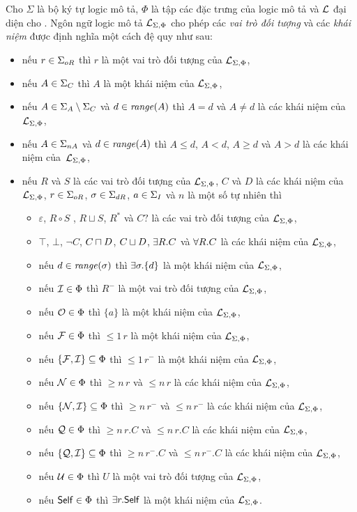 \begin{Definition}
\label{def:LSPLanguage}
Cho $\Sigma$ là bộ ký tự logic mô tả, $\Phi$ là tập các đặc trưng của logic mô tả và $\mathcal{L}$ đại diện cho \ALCreg. Ngôn ngữ logic mô tả $\mathcal{L}_{\Sigma,\Phi}$ cho phép các {\em vai trò đối tượng} và các {\em khái niệm} được định nghĩa một cách đệ quy như sau:
\begin{itemize}
	\item nếu $r \in \Sigma_{oR}$ thì $r$ là một vai trò đối tượng của $\mathcal{L}_{\Sigma,\Phi}$,
	\item nếu $A \in \Sigma_C$ thì $A$ là một khái niệm của $\mathcal{L}_{\Sigma,\Phi}$,
	\item nếu $A \in \Sigma_A\setminus\Sigma_C$ và $d \in \mathit{range}(A)$ thì $A=d$ và $A \neq d$ là các khái niệm của $\mathcal{L}_{\Sigma,\Phi}$,
	\item nếu $A \in \Sigma_{nA}$ và $d \in \mathit{range}(A)$ thì $A \leq d$, $A < d$, $A \geq d$ và $A > d$ là các khái niệm của~$\mathcal{L}_{\Sigma,\Phi}$,
	\item nếu $R$ và $S$ là các vai trò đối tượng của $\mathcal{L}_{\Sigma,\Phi}$, $C$ và $D$ là các khái niệm của $\mathcal{L}_{\Sigma,\Phi}$, $r \in \Sigma_{oR}$, $\sigma \in \Sigma_{dR}$, $a \in \Sigma_I$ và $n$ là một số tự nhiên thì
	\begin{itemize}
		\item $\varepsilon$, $R \circ S$ , $R \sqcup S$, $R^*$ và $C?$ là các vai trò đối tượng của $\mathcal{L}_{\Sigma,\Phi}$,
		\item $\top$, $\bot$, $\neg C$, $C \sqcap D$, $C \sqcup D$, $\exists R.C$ và $\forall R.C$ là các khái niệm của $\mathcal{L}_{\Sigma,\Phi}$,
		\item nếu $d \in \mathit{range}(\sigma)$ thì $\exists \sigma.\{d\}$ là một khái niệm của $\mathcal{L}_{\Sigma,\Phi}$,
		\item nếu $\mathcal{I} \in \Phi$ thì $R^-$ là một vai trò đối tượng của $\mathcal{L}_{\Sigma,\Phi}$,
		\item nếu $\mathcal{O} \in \Phi$ thì $\{a\}$ là một khái niệm của $\mathcal{L}_{\Sigma,\Phi}$,
		\item nếu $\mathcal{F} \in \Phi$ thì $\leq\!1\,r$ là một khái niệm của $\mathcal{L}_{\Sigma,\Phi}$,
		\item nếu $\{\mathcal{F}, \mathcal{I}\} \subseteq \Phi$ thì $\leq\!1\,r^-$ là một khái niệm của $\mathcal{L}_{\Sigma,\Phi}$,
		\item nếu $\mathcal{N} \in \Phi$ thì $\geq\!n\,r$ và $\leq\!n\,r$ là các khái niệm của $\mathcal{L}_{\Sigma,\Phi}$,
		\item nếu $\{\mathcal{N}, \mathcal{I}\} \subseteq \Phi$ thì $\geq\!n\,r^-$ và $\leq\!n\,r^-$ là các khái niệm của $\mathcal{L}_{\Sigma,\Phi}$,
		\item nếu $\mathcal{Q} \in \Phi$ thì $\geq\!n\,r.C$ và $\leq\!n\,r.C$ là các khái niệm của  $\mathcal{L}_{\Sigma,\Phi}$,
		\item nếu $\{\mathcal{Q}, \mathcal{I}\} \subseteq \Phi$ thì $\geq\!n\,r^-.C$ và $\leq\!n\,r^-.C$ là các khái niệm của $\mathcal{L}_{\Sigma,\Phi}$,
		\item nếu $\mathcal{U} \in \Phi$ thì $U$ là một vai trò đối tượng của $\mathcal{L}_{\Sigma,\Phi}$,
		\item nếu $\mathsf{Self} \in \Phi$ thì $\exists r.\mathsf{Self}$ là một khái niệm của $\mathcal{L}_{\Sigma,\Phi}$.\myend
	\end{itemize}
\end{itemize}
\end{Definition}


